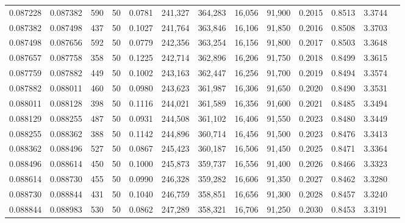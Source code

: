 \begin{tabular}{rrrrrrrrrrrrr}
0.087228 & 0.087382 &   590 &  50 &                                     0.0781 & 241,327 & 364,283 &  16,056 &  91,900 & 0.2015 & 0.8513 & 3.3744 \\
0.087382 & 0.087498 &   437 &  50 &                                     0.1027 & 241,764 & 363,846 &  16,106 &  91,850 & 0.2016 & 0.8508 & 3.3703 \\
0.087498 & 0.087656 &   592 &  50 &                                     0.0779 & 242,356 & 363,254 &  16,156 &  91,800 & 0.2017 & 0.8503 & 3.3648 \\
0.087657 & 0.087758 &   358 &  50 &                                     0.1225 & 242,714 & 362,896 &  16,206 &  91,750 & 0.2018 & 0.8499 & 3.3615 \\
0.087759 & 0.087882 &   449 &  50 &                                     0.1002 & 243,163 & 362,447 &  16,256 &  91,700 & 0.2019 & 0.8494 & 3.3574 \\
0.087882 & 0.088011 &   460 &  50 &                                     0.0980 & 243,623 & 361,987 &  16,306 &  91,650 & 0.2020 & 0.8490 & 3.3531 \\
0.088011 & 0.088128 &   398 &  50 &                                     0.1116 & 244,021 & 361,589 &  16,356 &  91,600 & 0.2021 & 0.8485 & 3.3494 \\
0.088129 & 0.088255 &   487 &  50 &                                     0.0931 & 244,508 & 361,102 &  16,406 &  91,550 & 0.2023 & 0.8480 & 3.3449 \\
0.088255 & 0.088362 &   388 &  50 &                                     0.1142 & 244,896 & 360,714 &  16,456 &  91,500 & 0.2023 & 0.8476 & 3.3413 \\
0.088362 & 0.088496 &   527 &  50 &                                     0.0867 & 245,423 & 360,187 &  16,506 &  91,450 & 0.2025 & 0.8471 & 3.3364 \\
0.088496 & 0.088614 &   450 &  50 &                                     0.1000 & 245,873 & 359,737 &  16,556 &  91,400 & 0.2026 & 0.8466 & 3.3323 \\
0.088614 & 0.088730 &   455 &  50 &                                     0.0990 & 246,328 & 359,282 &  16,606 &  91,350 & 0.2027 & 0.8462 & 3.3280 \\
0.088730 & 0.088844 &   431 &  50 &                                     0.1040 & 246,759 & 358,851 &  16,656 &  91,300 & 0.2028 & 0.8457 & 3.3240 \\
0.088844 & 0.088983 &   530 &  50 &                                     0.0862 & 247,289 & 358,321 &  16,706 &  91,250 & 0.2030 & 0.8453 & 3.3191 \\

\end{tabular}
